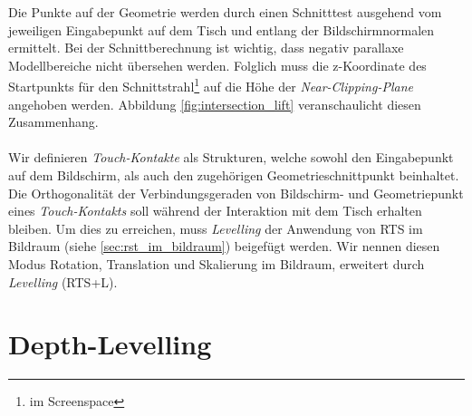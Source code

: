 Die Punkte auf der Geometrie werden durch einen Schnitttest ausgehend vom jeweiligen Eingabepunkt auf dem Tisch und entlang der Bildschirmnormalen ermittelt. Bei der Schnittberechnung ist wichtig, dass negativ parallaxe Modellbereiche nicht übersehen werden. Folglich muss die z-Koordinate des Startpunkts für den Schnittstrahl\footnote{im Screenspace} auf die Höhe der \emph{Near-Clipping-Plane} angehoben werden. Abbildung \ref{fig:intersection_lift} veranschaulicht diesen Zusammenhang.
\\\\
Wir definieren \emph{Touch-Kontakte} als Strukturen, welche sowohl den Eingabepunkt auf dem Bildschirm, als auch den zugehörigen Geometrieschnittpunkt beinhaltet. Die Orthogonalität der Verbindungsgeraden von Bildschirm- und Geometriepunkt eines \emph{Touch-Kontakts} soll während der Interaktion mit dem Tisch erhalten bleiben. Um dies zu erreichen, muss \emph{Levelling} der Anwendung von RTS im Bildraum (siehe \ref{sec:rst_im_bildraum}) beigefügt werden. Wir nennen diesen Modus Rotation, Translation und Skalierung im Bildraum, erweitert durch \emph{Levelling} (RTS+L).


\section{Depth-Levelling}
\label{sec:depth_levelling}

